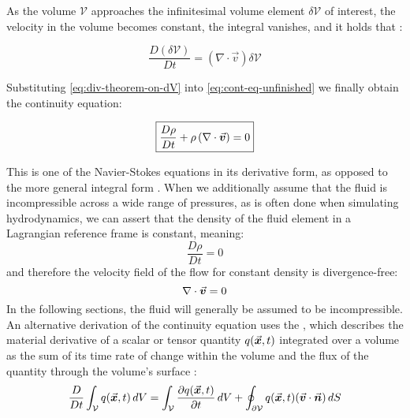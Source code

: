 As the volume $\mathcal{V}$ approaches the infinitesimal volume element $\delta \mathcal{V}$ of interest, the velocity in the volume becomes constant, the integral vanishes, and it holds that \autocite*{anderson}:


\begin{equation}\label{eq:div-theorem-on-dV}
    \frac{D(\delta \mathcal{V})}{D t} = \left( \nabla\cdot \vec{v}\right) \delta \mathcal{V}
\end{equation}

Substituting \autoref{eq:div-theorem-on-dV} into \autoref{eq:cont-eq-unfinished} we finally obtain the continuity equation:

\begin{equation}\label{eq:continuity-eq}
    \text{\fbox{$\frac{D\rho}{D t} + \rho\left( \nabla \cdot \vec{\bm{v}} \right) = 0$}}
\end{equation}

This is one of the Navier-Stokes equations in its derivative form, as opposed to the more general integral form \autocite*{anderson}. When we additionally assume that the fluid is incompressible across a wide range of pressures, as is often done when simulating hydrodynamics, we can assert that the density of the fluid element in a Lagrangian reference frame is constant, meaning:
\begin{equation}\label{eq:continuity-means-density-dt-zero}
    \frac{D\rho}{D t} = 0
\end{equation}
and therefore the velocity field of the flow for constant density is divergence-free\autocite*{continuum-intro}:
\begin{equation}\label{eq:continuity-means-velocity-divergence-zero}
    \nabla\cdot \vec{\bm{v}} = 0
\end{equation}
In the following sections, the fluid will generally be assumed to be incompressible.\\

An alternative derivation of the continuity equation uses the , which describes the material derivative of a scalar or tensor quantity $q(\vec{\bm{x}}, t)$ integrated over a volume as the sum of its time rate of change within the volume and the flux of the quantity through the volume's surface \autocite*{continuum-intro}:
\begin{equation}\label{eq:reynolds-transport-theorem}
    \frac{D}{D t}\int_\mathcal{V} q(\vec{\bm{x}}, t)\,dV = \int_\mathcal{V} \frac{\partial q(\vec{\bm{x}}, t)}{\partial t} \,dV + \oint_{\partial\mathcal{V}}  q(\vec{\bm{x}}, t)(\vec{\bm{v}} \cdot \vec{\bm{n}})\,dS
\end{equation}

